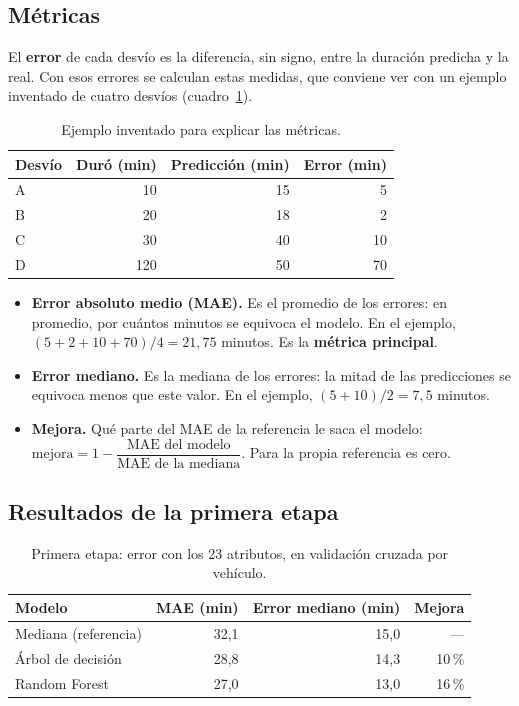 \documentclass[11pt,a4paper]{article}
\begin{document}
\subsection{Métricas}

El \textbf{error} de cada desvío es la diferencia, sin signo, entre la duración predicha y la real. Con esos
errores se calculan estas medidas, que conviene ver con un ejemplo inventado de cuatro desvíos
(cuadro~\ref{tab:ejemplo}).

\begin{table}[H]
  \centering
  \begin{tabular}{@{}lrrr@{}}
    \toprule
    \textbf{Desvío} & \textbf{Duró (min)} & \textbf{Predicción (min)} & \textbf{Error (min)} \\
    \midrule
    A & 10  & 15 & 5 \\
    B & 20  & 18 & 2 \\
    C & 30  & 40 & 10 \\
    D & 120 & 50 & 70 \\
    \bottomrule
  \end{tabular}
  \caption{Ejemplo inventado para explicar las métricas.}
  \label{tab:ejemplo}
\end{table}

\begin{itemize}[nosep]
  \item \textbf{Error absoluto medio (MAE).} Es el promedio de los errores: en promedio, por cuántos
  minutos se equivoca el modelo. En el ejemplo, $(5+2+10+70)/4 = 21{,}75$ minutos. Es la \textbf{métrica
  principal}.
  \item \textbf{Error mediano.} Es la mediana de los errores: la mitad de las predicciones se equivoca
  menos que este valor. En el ejemplo, $(5+10)/2 = 7{,}5$ minutos.
  \item \textbf{Mejora.} Qué parte del MAE de la referencia le saca el modelo:
  $\text{mejora} = 1 - \dfrac{\text{MAE del modelo}}{\text{MAE de la mediana}}$. Para la propia referencia
  es cero.
\end{itemize}

\subsection{Resultados de la primera etapa}

\begin{table}[H]
  \centering
  \begin{tabular}{@{}lrrr@{}}
    \toprule
    \textbf{Modelo} & \textbf{MAE (min)} & \textbf{Error mediano (min)} & \textbf{Mejora} \\
    \midrule
    Mediana (referencia) & 32,1 & 15,0 & --- \\
    Árbol de decisión    & 28,8 & 14,3 & 10\,\% \\
    Random Forest        & 27,0 & 13,0 & 16\,\% \\
    \bottomrule
  \end{tabular}
  \caption{Primera etapa: error con los 23 atributos, en validación cruzada por vehículo.}
  \label{tab:etapa1}
\end{table}
\end{document}
